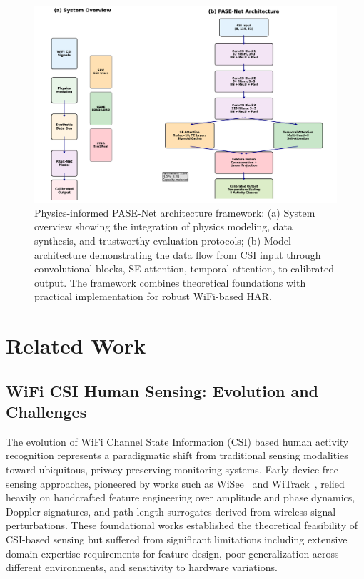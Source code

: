 \documentclass[journal]{IEEEtran}
\begin{document}
\begin{figure}[t]
\centering
\includegraphics[width=\linewidth]{plots/fig1_system_architecture.pdf}
\caption{Physics-informed PASE-Net architecture framework: (a) System overview showing the integration of physics modeling, data synthesis, and trustworthy evaluation protocols; (b) Model architecture demonstrating the data flow from CSI input through convolutional blocks, SE attention, temporal attention, to calibrated output. The framework combines theoretical foundations with practical implementation for robust WiFi-based HAR.}
\label{fig:system_architecture}
\end{figure}

\section{Related Work}

\subsection{WiFi CSI Human Sensing: Evolution and Challenges}

The evolution of WiFi Channel State Information (CSI) based human activity recognition represents a paradigmatic shift from traditional sensing modalities toward ubiquitous, privacy-preserving monitoring systems. Early device-free sensing approaches, pioneered by works such as WiSee~\cite{pu2013whole} and WiTrack~\cite{adib2013see}, relied heavily on handcrafted feature engineering over amplitude and phase dynamics, Doppler signatures, and path length surrogates derived from wireless signal perturbations. These foundational works established the theoretical feasibility of CSI-based sensing but suffered from significant limitations including extensive domain expertise requirements for feature design, poor generalization across different environments, and sensitivity to hardware variations.
\end{document}
